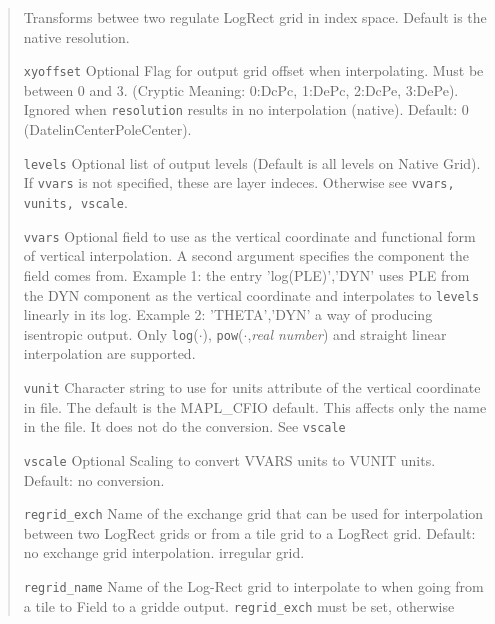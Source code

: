 \begin{quote}
\begin{trivlist}
                         Transforms betwee two regulate LogRect grid in index space. 
                         Default is the native resolution.
\item[\tt xyoffset]      Optional Flag for output grid offset when interpolating. Must be
                         between 0 and 3. (Cryptic Meaning: 0:DcPc, 1:DePc, 2:DcPe, 3:DePe).
                         Ignored when {\tt resolution} results in no interpolation (native).
                         Default: 0 (DatelinCenterPoleCenter). 
\item[\tt levels]        Optional list of output levels (Default is all levels on Native Grid).
                         If {\tt vvars} is not specified, these are layer indeces. Otherwise
                         see {\tt vvars, vunits, vscale}.
\item[\tt vvars]         Optional field to use as the vertical coordinate and functional form
                         of vertical interpolation. A second argument specifies 
                         the component the field comes from. 
                         Example 1: the entry 'log(PLE)','DYN' uses PLE from the
                         DYN component as the vertical coordinate and interpolates
                         to {\tt levels} linearly in its log. Example 2: 'THETA','DYN'
                         a way of producing isentropic output.
                         Only {\tt log}($\cdot$), {\tt pow}($\cdot$,{\em real number})
                         and straight linear interpolation are supported.
\item[\tt vunit]         Character string to use for units attribute of the vertical 
                         coordinate in file. 
                         The default is the MAPL\_CFIO default. 
                         This affects only the name in the file.
                         It does not do the conversion. See {\tt vscale}
\item[\tt vscale]        Optional Scaling to convert VVARS units to VUNIT units.
                         Default: no conversion.
\item[\tt regrid\_exch]  Name of the exchange grid that can be used for interpolation
                         between two LogRect grids or from a tile grid to a LogRect grid.
                         Default: no exchange grid interpolation.
                         irregular grid.
\item[\tt regrid\_name]  Name of the Log-Rect grid to interpolate to when going from a tile 
                         to Field to a gridde output. {\tt regrid\_exch} must be set, otherwise

\end{trivlist}
\end{quote}
